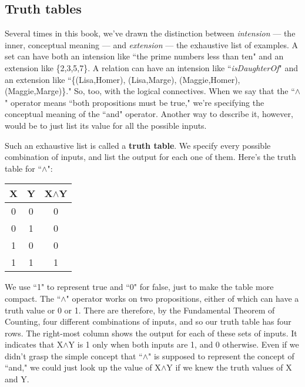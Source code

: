 \subsection{Truth tables}

Several times in this book, we've drawn the distinction between
\textit{intension} --- the inner, conceptual meaning --- and
\textit{extension} --- the exhaustive list of examples. A set can have both
an intension like ``the prime numbers less than ten" and an extension like
\{2,3,5,7\}. A relation can have an intension like ``\textsl{isDaughterOf}"
and an extension like ``\{(Lisa,Homer), (Lisa,Marge), (Maggie,Homer),
(Maggie,Marge)\}." So, too, with the logical connectives. When we say that
the ``$\wedge$" operator means ``both propositions must be true," we're
specifying the conceptual meaning of the ``and" operator. Another way to
describe it, however, would be to just list its value for all the possible
inputs.

Such an exhaustive list is called a \textbf{truth table}. We specify every
possible combination of inputs, and list the output for each one of them.
Here's the truth table for ``$\wedge$":
\begin{nobreak}
\begin{center}
\begin{tabular}{c|c c}
X & Y & X$\wedge$Y \\
\hline
0 & 0 & 0 \\
0 & 1 & 0 \\
1 & 0 & 0 \\
1 & 1 & 1 \\
\end{tabular}
\end{center}
\end{nobreak}
We use ``1" to represent true and ``0" for false, just to make the table
more compact. The ``$\wedge$" operator works on two propositions, either of
which can have a truth value or 0 or 1. There are therefore, by the
Fundamental Theorem of Counting, four different combinations of inputs, and
so our truth table has four rows. The right-most column shows the output
for each of these sets of inputs. It indicates that X$\wedge$Y is 1 only
when both inputs are 1, and 0 otherwise. Even if we didn't grasp the simple
concept that ``$\wedge$" is supposed to represent the concept of ``and," we
could just look up the value of X$\wedge$Y if we knew the truth values of X
and Y.

